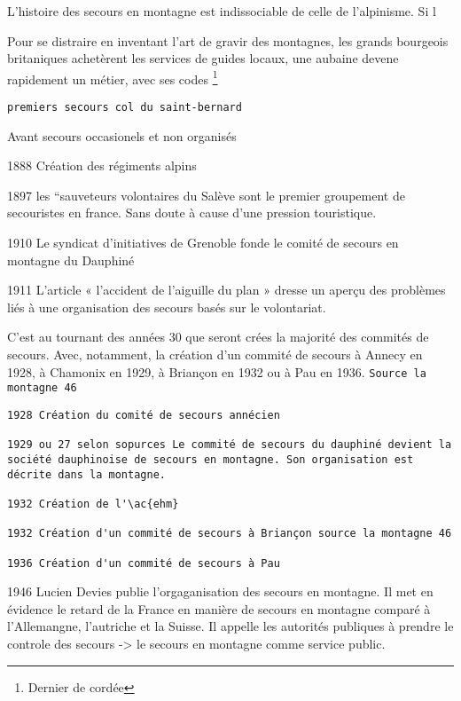L'histoire des secours en montagne est indissociable de celle de
l'alpinisme. Si l

\begin{displayquote}
  \og Pour se distraire en inventant l'art de gravir des montagnes,
  les grands bourgeois britaniques achetèrent les services de \og
  guides \fg locaux, une aubaine devene rapidement un métier, avec ses
  codes \textelp{}\fg{} \footnote{Dernier de cordée}
\end{displayquote}

\begin{verbatim}
premiers secours col du saint-bernard
\end{verbatim}


Avant secours occasionels et non organisés

1888 Création des régiments alpins

1897 les ``sauveteurs volontaires du  Salève sont le premier groupement
de secouristes en france. Sans doute à cause d'une pression touristique.

1910 Le syndicat d'initiatives de Grenoble fonde le comité de secours
en montagne du Dauphiné

1911 L'article « l'accident de l'aiguille du plan » dresse un aperçu
des problèmes liés à une organisation des secours basés sur le
volontariat.

C'est au tournant des années 30 que seront crées la majorité des
commités de secours. Avec, notamment, la création d'un commité de
secours à Annecy en 1928, à Chamonix en 1929, à Briançon en 1932 ou à
Pau en 1936. \texttt{Source la montagne 46}

\begin{verbatim}
1928 Création du comité de secours annécien

1929 ou 27 selon sopurces Le commité de secours du dauphiné devient la
société dauphinoise de secours en montagne. Son organisation est
décrite dans la montagne.

1932 Création de l'\ac{ehm}

1932 Création d'un commité de secours à Briançon source la montagne 46

1936 Création d'un commité de secours à Pau
\end{verbatim}


1946 Lucien Devies publie l'orgaganisation des secours en montagne. Il
met en évidence le retard de la France en manière de secours en
montagne comparé à l'Allemangne, l'autriche et la Suisse. Il appelle
les autorités publiques à prendre le controle des secours -> le
secours en montagne comme service public.

